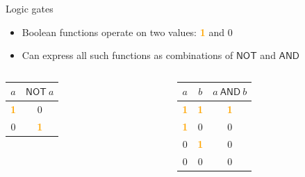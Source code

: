 \documentclass{beamer}
\newcommand{\on}[0]{\textcolor{orange}{\bf 1}\xspace}
\newcommand{\off}[0]{0\xspace}
\begin{document}
\begin{frame}{Logic gates}
	\pause
	\begin{itemize}
		\item Boolean functions operate on two values: \on and \off
		\item Can express all such functions as combinations of $\mathsf{NOT}$ and $\mathsf{AND}$ 
	\end{itemize}

	\bigskip
	\begin{columns}[onlytextwidth]
		\begin{column}{0.5\textwidth}
			\centering
			\begin{tabular}{c|c}
				$a$ & $\mathsf{NOT}~ a$ \\
				\hline
				\on & \off \\
				\off & \on
			\end{tabular}
		\end{column}

		\begin{column}{0.5\textwidth}
			\centering
			\begin{tabular}{c|c|c}
				$a$ & $b$ & $a ~\mathsf{AND}~ b$ \\
				\hline
				\on & \on & \on \\
				\on & \off & \off \\
				\off & \on & \off \\
				\off & \off & \off
			\end{tabular}
		\end{column}
	\end{columns}

\end{frame}
\end{document}
